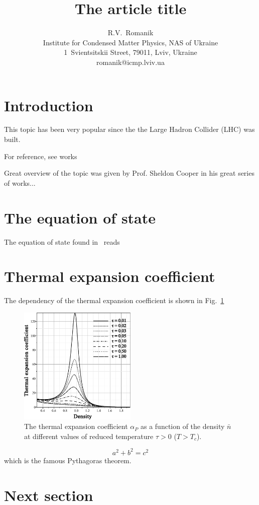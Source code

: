 \documentclass[12pt]{article}
\title{The article title}
\author{R.V.~Romanik
	\\ \small Institute for Condensed Matter Physics, NAS of Ukraine 
	\\ \small 1~Svientsitskii Street, 79011, Lviv, Ukraine 
	\\ \small romanik@icmp.lviv.ua}
\begin{document}
	
	\maketitle
	
	
	\section{Introduction}
	This topic has been very popular since the the Large Hadron Collider (LHC) was built.
	
	For reference, see works~\cite{Cooper} \nocite{*}
	
	Great overview of the topic was given by Prof. Sheldon Cooper in his great series of works...
	

	\section{The equation of state}
	The equation of state found in~\cite{KozitskyKozlovskiiDobush2020} reads

	\section{Thermal expansion coefficient}
	The dependency of the thermal expansion coefficient is shown in Fig.~\ref{fig4}
		\begin{figure}[h!]
		\centering \includegraphics[width=0.5\textwidth]{f4.pdf}
		\vskip-3mm\caption{The thermal expansion coefficient $\alpha_P$ as a function of the density $\bar n$ at different values of reduced temperature $\tau > 0$ ($T > T_c$). 
		}\label{fig4}
	\end{figure}
	
	\begin{equation}
		a^2 + b^2 = c^2
	\end{equation}
	which is the famous Pythagoras theorem.
	
	\section{Next section}

	
	
	
	
\end{document}

